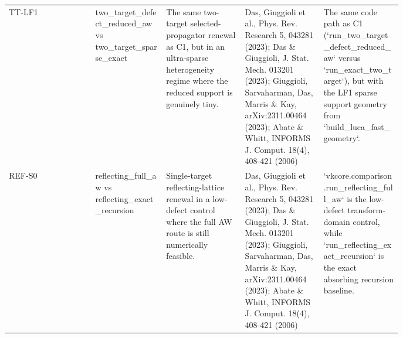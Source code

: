 \begin{tabular}{lp{0.18\linewidth}p{0.20\linewidth}p{0.20\linewidth}p{0.20\linewidth}}
TT-LF1 & two\_target\_defect\_reduced\_aw vs two\_target\_sparse\_exact & The same two-target selected-propagator renewal as C1, but in an ultra-sparse heterogeneity regime where the reduced support is genuinely tiny. & Das, Giuggioli et al., Phys. Rev. Research 5, 043281 (2023); Das \& Giuggioli, J. Stat. Mech. 013201 (2023); Giuggioli, Sarvaharman, Das, Marris \& Kay, arXiv:2311.00464 (2023); Abate \& Whitt, INFORMS J. Comput. 18(4), 408-421 (2006) & The same code path as C1 (`run\_two\_target\_defect\_reduced\_aw` versus `run\_exact\_two\_target`), but with the LF1 sparse support geometry from `build\_luca\_fast\_geometry`. \\
REF-S0 & reflecting\_full\_aw vs reflecting\_exact\_recursion & Single-target reflecting-lattice renewal in a low-defect control where the full AW route is still numerically feasible. & Das, Giuggioli et al., Phys. Rev. Research 5, 043281 (2023); Das \& Giuggioli, J. Stat. Mech. 013201 (2023); Giuggioli, Sarvaharman, Das, Marris \& Kay, arXiv:2311.00464 (2023); Abate \& Whitt, INFORMS J. Comput. 18(4), 408-421 (2006) & `vkcore.comparison.run\_reflecting\_full\_aw` is the low-defect transform-domain control, while `run\_reflecting\_exact\_recursion` is the exact absorbing recursion baseline. \\
\bottomrule
\end{tabular}
